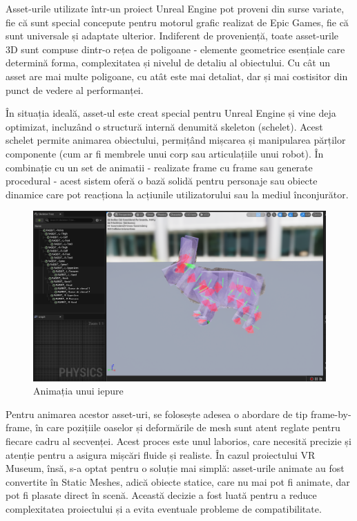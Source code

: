 Asset-urile utilizate într-un proiect Unreal Engine pot proveni din surse variate, fie că sunt special concepute pentru motorul grafic realizat de Epic Games, fie că sunt universale și adaptate ulterior. Indiferent de proveniență, toate asset-urile 3D sunt compuse dintr-o rețea de poligoane - elemente geometrice esențiale care determină forma, complexitatea și nivelul de detaliu al obiectului. Cu cât un asset are mai multe poligoane, cu atât este mai detaliat, dar și mai costisitor din punct de vedere al performanței.

În situația ideală, asset-ul este creat special pentru Unreal Engine și vine deja optimizat, incluzând o structură internă denumită skeleton (schelet). Acest schelet permite animarea obiectului, permițând mișcarea și manipularea părților componente (cum ar fi membrele unui corp sau articulațiile unui robot). În combinație cu un set de animatii - realizate frame cu frame sau generate procedural - acest sistem oferă o bază solidă pentru personaje sau obiecte dinamice care pot reacționa la acțiunile utilizatorului sau la mediul înconjurător.

\begin{figure} [htp] 
\centering 
\includegraphics [width=12cm]
{continut/capitol3/figuri/rabbit.png} 
\caption{Animația unui iepure} 
\label{fig:Museum} 
\end{figure}

Pentru animarea acestor asset-uri, se folosește adesea o abordare de tip frame-by-frame, în care pozițiile oaselor și deformările de mesh sunt atent reglate pentru fiecare cadru al secvenței. Acest proces este unul laborios, care necesită precizie și atenție pentru a asigura mișcări fluide și realiste. În cazul proiectului VR Museum, însă, s-a optat pentru o soluție mai simplă: asset-urile animate au fost convertite în Static Meshes, adică obiecte statice, care nu mai pot fi animate, dar pot fi plasate direct în scenă. Această decizie a fost luată pentru a reduce complexitatea proiectului și a evita eventuale probleme de compatibilitate.

